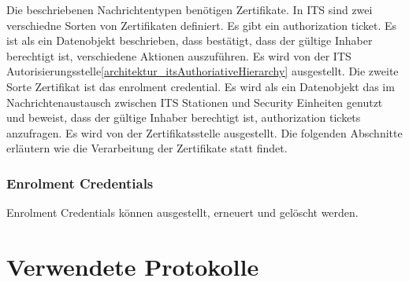 Die beschriebenen Nachrichtentypen benötigen Zertifikate. In \ac{ITS} sind zwei verschiedne Sorten von Zertifikaten definiert. Es gibt ein \glqq  authorization ticket\grqq. Es ist als ein Datenobjekt beschrieben, dass bestätigt, dass der gültige Inhaber berechtigt ist, verschiedene Aktionen auszuführen. Es wird von der ITS Autorisierungsstelle\ref{architektur_itsAuthoriativeHierarchy} ausgestellt. Die zweite Sorte Zertifikat ist das \glqq enrolment credential\grqq. Es wird als ein Datenobjekt das im Nachrichtenaustausch zwischen \ac{ITS} Stationen und Security Einheiten genutzt und beweist, dass der gültige Inhaber berechtigt ist, authorization tickets anzufragen. Es wird von der Zertifikatsstelle ausgestellt. Die folgenden Abschnitte erläutern wie die Verarbeitung der Zertifikate statt findet.

\subsubsection{Enrolment Credentials}
Enrolment Credentials können ausgestellt, erneuert und gelöscht werden. 



\section{Verwendete Protokolle}




